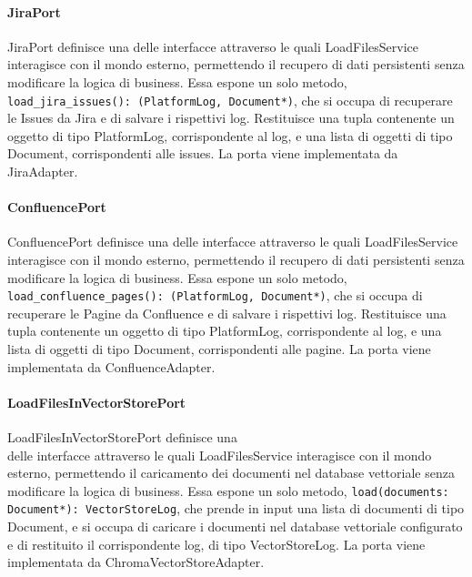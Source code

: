 \paragraph{JiraPort}
\label{sec:jira_port}
JiraPort definisce una delle interfacce attraverso le quali LoadFilesService interagisce con il mondo esterno, permettendo il recupero di dati persistenti senza modificare la logica di business. Essa espone un solo metodo, \texttt{load\_jira\_issues(): (PlatformLog, Document*)}, che si occupa di recuperare le Issues da Jira e di salvare i rispettivi log. Restituisce una tupla contenente un oggetto di tipo PlatformLog, corrispondente al log, e una lista di oggetti di tipo Document, corrispondenti alle issues. La porta viene implementata da JiraAdapter.

\paragraph{ConfluencePort}
\label{sec:confluence_port}
ConfluencePort definisce una delle interfacce attraverso le quali LoadFilesService interagisce con il mondo esterno, permettendo il recupero di dati persistenti senza modificare la logica di business. Essa espone un solo metodo, \texttt{load\_confluence\_pages(): (PlatformLog, Document*)}, che si occupa di recuperare le Pagine da Confluence e di salvare i rispettivi log. Restituisce una tupla contenente un oggetto di tipo PlatformLog, corrispondente al log, e una lista di oggetti di tipo Document, corrispondenti alle pagine. La porta viene implementata da ConfluenceAdapter.

\paragraph{LoadFilesInVectorStorePort}
\label{sec:load_files_in_vector_store_port}
LoadFilesInVectorStorePort definisce una\\ delle interfacce attraverso le quali LoadFilesService interagisce con il mondo esterno, permettendo il caricamento dei documenti nel database vettoriale senza modificare la logica di business. Essa espone un solo metodo, \texttt{load(documents: Document*): VectorStoreLog}, che prende in input una lista di documenti di tipo Document, e si occupa di caricare i documenti nel database vettoriale configurato e di restituito il corrispondente log, di tipo VectorStoreLog. La porta viene implementata da ChromaVectorStoreAdapter.

